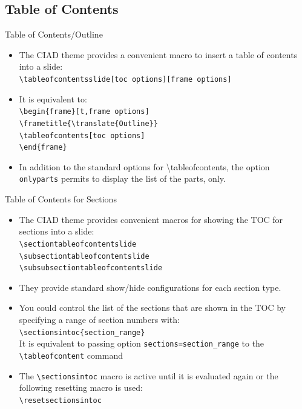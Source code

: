 \documentclass[english,sectioncirclenumberstyle]{ciadbeamer}
\begin{document}
\subsection{Table of Contents}

\begin{frame}{Table of Contents/Outline}
	\begin{itemize}
	\item The CIAD theme provides a convenient macro to insert a table of contents into a slide: \\
		\texttt{{\textbackslash}tableofcontentsslide[toc options][frame options]}
	\vspace{1em}
	\item It is equivalent to: \\
		\texttt{{\textbackslash}begin\{frame\}[t,frame options]} \\
		\texttt{{\textbackslash}frametitle\{{\textbackslash}translate\{Outline\}\}} \\
		\texttt{{\textbackslash}tableofcontents[toc options]} \\
		\texttt{{\textbackslash}end\{frame\}}
	\vspace{1em}
	\item In addition to the standard options for {{\textbackslash}tableofcontents}, the option \texttt{onlyparts} permits to display the list of the parts, only.
	\end{itemize}
\end{frame}

\begin{frame}{Table of Contents for Sections}
	\begin{itemize}
	\item The CIAD theme provides convenient macros for showing the TOC for sections into a slide: \\
		\texttt{{\textbackslash}sectiontableofcontentslide} \\
		\texttt{{\textbackslash}subsectiontableofcontentslide} \\
		\texttt{{\textbackslash}subsubsectiontableofcontentslide}
	\item They provide standard show/hide configurations for each section type.
	\item You could control the list of the sections that are shown in the TOC by specifying a range of section numbers with: \\
		\texttt{{\textbackslash}sectionsintoc\{section\_range\}} \\
		It is equivalent to passing option \texttt{sections={section\_range}} to the \texttt{{\textbackslash}tableofcontent} command
	\item The \texttt{{\textbackslash}sectionsintoc} macro is active until it is evaluated again or the following resetting macro is used: \\
		\texttt{{\textbackslash}resetsectionsintoc}
	\end{itemize}
\end{frame}
\end{document}
